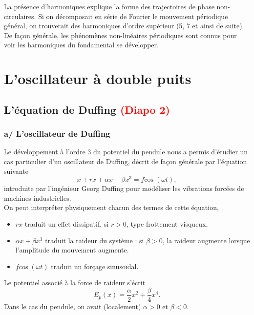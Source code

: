 \documentclass[11pt,a4paper]{report}
\begin{document}
La présence d'harmoniques explique la forme des trajectoires de phase non-circulaires. Si on décomposait en série de Fourier le mouvement périodique général, on trouverait des harmoniques d'ordre supérieur (5, 7 et ainsi de suite).\\

De façon générale, les phénomènes non-linéaires périodiques sont connus pour voir les harmoniques du fondamental se développer.


\section{L'oscillateur à double puits}

\subsection{L'équation de Duffing \textcolor{red}{(Diapo 2)}}

\subsubsection*{a/ L'oscillateur de Duffing}

Le développement à l'ordre 3 du potentiel du pendule nous a permis d'étudier un cas particulier d'un oscillateur de Duffing, décrit de façon générale par l'équation suivante
\begin{equation}
	\boxed{\ddot{x} + r\dot{x} + \alpha x + \beta x^3 = f\text{cos}\;(\omega t)},
\end{equation}
introduite par l'ingénieur Georg Duffing pour modéliser les vibrations forcées de machines industrielles.\\

On peut interpréter physiquement chacun des termes de cette équation,
\begin{itemize}
	\item $r\dot{x}$ traduit un effet dissipatif, si $r > 0$, type frottement visqueux,
	\item $\alpha x + \beta x^3$ traduit la raideur du système : si $\beta > 0$, la raideur 			augmente lorsque l'amplitude du mouvement augmente.
	\item $f \text{cos}\;(\omega t)$ traduit un forçage sinusoïdal.\\
\end{itemize}

Le potentiel associé à la force de raideur s'écrit
\begin{equation}
	\boxed{E_p(x) = \frac{\alpha}{2}x^2 + \frac{\beta}{4}x^4}.
\end{equation}
Dans le cas du pendule, on avait (localement) $\alpha > 0$ et $\beta < 0$.\\
\end{document}

